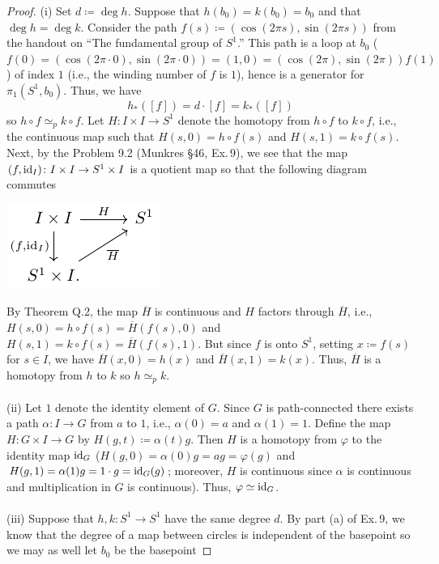 \begin{proof}
(i) Set $d\coloneqq\deg h$. Suppose that $h(b_0)=k(b_0)=b_0$ and that $\deg
h=\deg k$. Consider the path $f(s)\coloneqq(\cos(2\pi s),\sin(2\pi s))$
from the handout on ``The fundamental group of $S^1$.'' This path is a loop
at $b_0$ ($f(0)=(\cos(2\pi\cdot 0),\sin(2\pi\cdot
0))=(1,0)=(\cos(2\pi),\sin(2\pi))f(1)$) of index $1$ (i.e., the winding
number of $f$ is $1$), hence is a generator for $\pi_1(S^1,b_0)$. Thus, we
have
\[
h_*([f])=d\cdot[f]=k_*([f])
\]
so $h\circ f\simeq_p k\circ f$. Let $H\colon I\times I\to S^1$ denote the
homotopy from $h\circ f$ to $k\circ f$, i.e., the continuous map such that
$H(s,0)=h\circ f(s)$ and $H(s,1)=k\circ f(s)$. Next, by the Problem 9.2
(Munkres \S46, Ex.\,9), we see that the map $(f,\operatorname{id}_I)\colon I\times I\to
S^1\times I$ is a quotient map so that the following diagram commutes
\begin{center}
\includegraphics{figures/hw-13-degree-diagram}
\end{center}
By Theorem Q.2, the map $\overline H$ is continuous and $H$ factors through
$\overline H$, i.e., $H(s,0)=h\circ f(s)=\overline{H}(f(s),0)$ and
$H(s,1)=k\circ f(s)=\overline{H}(f(s),1)$. But since $f$ is onto $S^1$,
setting $x\coloneqq f(s)$ for $s\in I$, we have $\overline{H}(x,0)=h(x)$
and $\overline{H}(x,1)=k(x)$. Thus, $\overline{H}$ is a homotopy from $h$
to $k$ so $h\simeq_p k$.
\\\\
(ii) Let $1$ denote the identity element of $G$. Since $G$ is
path-connected there exists a path $\alpha\colon I\to G$ from $a$ to
$1$, i.e., $\alpha(0)=a$ and $\alpha(1)=1$. Define the map $H\colon G\times
I\to G$ by $H(g,t)\coloneqq\alpha(t)g$. Then $H$ is a homotopy from
$\varphi$ to the identity map $\operatorname{id}_G$ ($H(g,0)=\alpha(0)g=ag=\varphi(g)$
and $H(g,1)=\alpha(1)g=1\cdot g=\operatorname{id}_{G}(g)$; moreover, $H$ is continuous
since $\alpha$ is continuous and multiplication in $G$ is
continuous). Thus, $\varphi\simeq\operatorname{id}_G$.
\\\\
(iii) Suppose that $h,k\colon S^1\to S^1$ have the same degree $d$. By part
(a) of Ex.\,9, we know that the degree of a map between circles is
independent of the basepoint so we may as well let $b_0$ be the basepoint

\end{proof}
